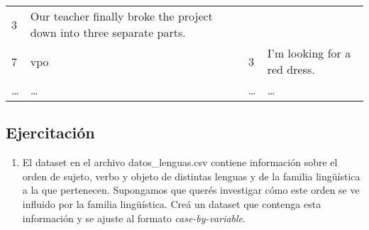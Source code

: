 \documentclass[authoryear,a4paper, 14pt]{scrartcl}
\begin{document}
\begin{longtable}[]{@{}llll@{}}
\begin{minipage}[t]{0.09\columnwidth}
3\strut
\end{minipage} & \begin{minipage}[t]{0.63\columnwidth}\raggedright
Our teacher finally broke the project down into three separate
parts.\strut
\end{minipage}\tabularnewline
\begin{minipage}[t]{0.08\columnwidth}\raggedright
7\strut
\end{minipage} & \begin{minipage}[t]{0.09\columnwidth}\raggedright
vpo\strut
\end{minipage} & \begin{minipage}[t]{0.09\columnwidth}\raggedright
3\strut
\end{minipage} & \begin{minipage}[t]{0.63\columnwidth}\raggedright
I'm looking for a red dress.\strut
\end{minipage}\tabularnewline
\begin{minipage}[t]{0.08\columnwidth}\raggedright
\ldots{}\strut
\end{minipage} & \begin{minipage}[t]{0.09\columnwidth}\raggedright
\ldots{}\strut
\end{minipage} & \begin{minipage}[t]{0.09\columnwidth}\raggedright
\ldots{}\strut
\end{minipage} & \begin{minipage}[t]{0.63\columnwidth}\raggedright
\ldots{}\strut
\end{minipage}\tabularnewline
\bottomrule
\end{longtable}

\hypertarget{ejercitacion-6}{%
\subsection{Ejercitación}\label{ejercitacion-6}}

\begin{enumerate}
    \item
      El dataset en el archivo datos\_lenguas.csv contiene información
      sobre el orden de sujeto, verbo y objeto de distintas lenguas y de la
      familia lingüística a la que pertenecen. Supongamos que querés investigar cómo este
      orden se ve influido por la familia lingüística. Creá un dataset que
      contenga esta información y se ajuste al formato
      \emph{case-by-variable}.
\end{enumerate}
\end{document}
